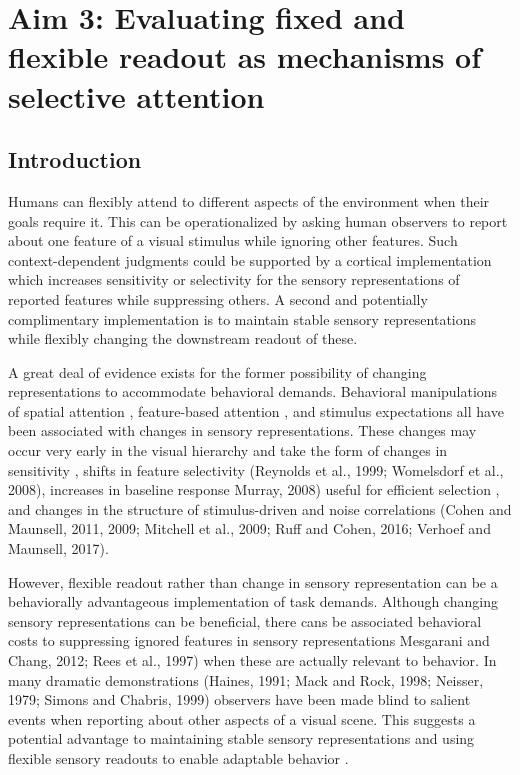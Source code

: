 \documentclass{report}
\begin{document}
\chapter[Fixed vs. flexible readout]{Aim 3: Evaluating fixed and flexible readout as mechanisms of selective attention}

\section{Introduction}

Humans can flexibly attend to different aspects of the environment when their goals require it. This can be operationalized by asking human observers to report about one feature of a visual stimulus while ignoring other features. Such context-dependent judgments could be supported by a cortical implementation which increases sensitivity or selectivity for the sensory representations of reported features while suppressing others. A second and potentially complimentary implementation is to maintain stable sensory representations while flexibly changing the downstream readout of these. 

A great deal of evidence exists for the former possibility of changing representations to accommodate behavioral demands. Behavioral manipulations of spatial attention \citep{Klein2014-oe,Mitchell2009-do,Pestilli2011-gi,Womelsdorf2006-np}, feature-based attention \citep{Baldauf2014-uj,Harel2014-wd,Huk2000-uj,Jehee2011-mb,Serences2007-le,Cohen2013-uz,Treue1999-mp}, and stimulus expectations \citep{Kok2012-rh,Kok2013-km} all have been associated with changes in sensory representations. These changes may occur very early in the visual hierarchy \citep{Ling2015-fr} and take the form of changes in sensitivity \citep{Reynolds2000-mg,Serences2007-le,Snyder2018-yr,Treue1999-mp}, shifts in feature selectivity \citep{Cukur2013-gx,David2008-zx,Kastner1998-bi,Klein2014-oe,Spitzer1988-ib,Womelsdorf2006-np} (Reynolds et al., 1999; Womelsdorf et al., 2008), increases in baseline response \citep{Buracas2007-pe,Chen2012-ek,Kastner1999-qu,Ress2000-pa,Li2008-fe} Murray, 2008) useful for efficient selection \citep{Hara2014-tm,Pestilli2011-gi}, and changes in the structure of stimulus-driven and noise correlations (Cohen and Maunsell, 2011, 2009; Mitchell et al., 2009; Ruff and Cohen, 2016; Verhoef and Maunsell, 2017). 

However, flexible readout rather than change in sensory representation can be a behaviorally advantageous implementation of task demands. Although changing sensory representations can be beneficial, there cans be associated behavioral costs to suppressing ignored features in sensory representations \citep{Gazzaley2005-vd}  Mesgarani and Chang, 2012; Rees et al., 1997) when these are actually relevant to behavior. In many dramatic demonstrations (Haines, 1991; Mack and Rock, 1998; Neisser, 1979; Simons and Chabris, 1999) observers have been made blind to salient events when reporting about other aspects of a visual scene. This suggests a potential advantage to maintaining stable sensory representations and using flexible sensory readouts to enable adaptable behavior \citep{Bugatus2017-wl,Mante2013-tn,Peelen2009-us}.
\end{document}
